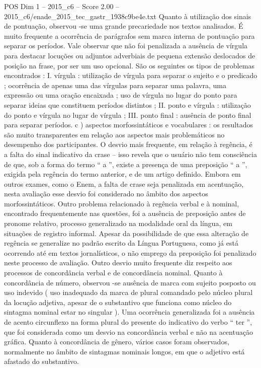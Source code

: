\begin{textsample}{POS Dim 1 – 2015\_c6 – Score 2.00 – 2015\_c6/enade\_2015\_tec\_gastr\_1938c9be4e.txt}
Quanto à utilização dos sinais de pontuação, observou -se uma grande precariedade nos textos analisados.
É muito frequente a ocorrência de parágrafos sem marca interna de pontuação para separar os períodos.
Vale observar que não foi penalizada a ausência de vírgula para destacar locuções ou adjuntos adverbiais de pequena extensão deslocados de posição na frase, por ser um uso opcional.
São os seguintes os tipos de problemas encontrados : I. vírgula : utilização de vírgula para separar o sujeito e o predicado ; ocorrência de apenas uma das vírgulas para separar uma palavra, uma expressão ou uma oração encaixada ; uso de vírgula no lugar do ponto para separar ideias que constituem períodos distintos ; II. ponto e vírgula : utilização do ponto e vírgula no lugar de vírgula ; III. ponto final : ausência de ponto final para separar períodos. c ) aspectos morfossintáticos e vocabulares : os resultados são muito transparentes em relação aos aspectos mais problemáticos no desempenho dos participantes.
O desvio mais frequente, em relação à regência, é a falta do sinal indicativo da crase – isso revela que o usuário não tem consciência de que, sob a forma do termo “ a ”, existe a presença de uma preposição “ a ”, exigida pela regência do termo anterior, e de um artigo definido.
Embora em outros exames, como o Enem, a falta de crase seja penalizada em acentuação, nesta avaliação esse desvio foi considerado no âmbito dos aspectos morfossintáticos.
Outro problema relacionado à regência verbal e à nominal, encontrado frequentemente nas questões, foi a ausência de preposição antes de pronome relativo, processo generalizado na modalidade oral da língua, em situações de registro informal.
Apesar da possibilidade de que essa alteração de regência se generalize no padrão escrito da Língua Portuguesa, como já está ocorrendo até em textos jornalísticos, o não emprego da preposição foi penalizado neste processo de avaliação.
Outro desvio muito frequente diz respeito aos processos de concordância verbal e de concordância nominal.
Quanto à concordância de número, observou -se ausência de marca com sujeito posposto ou uso indevido ( uso inadequado da marca de plural comandado pelo núcleo plural da locução adjetiva, apesar de o substantivo que funciona como núcleo do sintagma nominal estar no singular ).
Uma ocorrência generalizada foi a ausência de acento circunflexo na forma plural do presente do indicativo do verbo “ ter ”, que foi considerada como um desvio na concordância verbal e não na acentuação gráfica.
Quanto à concordância de gênero, vários casos foram observados, normalmente no âmbito de sintagmas nominais longos, em que o adjetivo está afastado do substantivo.

\end{textsample}
